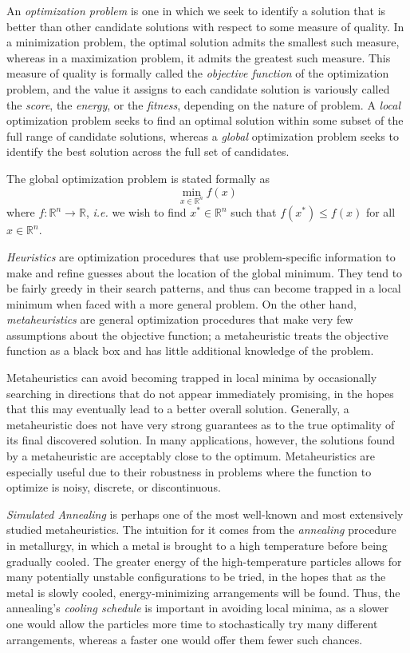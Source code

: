 \documentclass[12pt]{article}
\begin{document}
An \emph{optimization problem} is one in which we seek to identify a solution
that is better than other candidate solutions with respect to some measure
of quality.
In a minimization problem, the optimal solution admits the smallest
such measure, whereas in a maximization problem, it admits the greatest such
measure.
This measure of quality is formally called the \emph{objective function} of the
optimization problem, and the value it assigns to each candidate solution is
variously called the \emph{score}, the \emph{energy}, or the \emph{fitness},
depending on the nature of problem.
A \emph{local} optimization problem seeks to find an optimal solution within
some subset of the full range of candidate solutions, whereas a \emph{global}
optimization problem seeks to identify the best solution across the full set of
candidates.

The global optimization problem is stated formally as
$$
\min_{x \in \mathbb{R}^n} f(x)
$$
where $f : \mathbb{R}^n \to \mathbb{R}$,
\emph{i.e.} we wish to find $x^* \in \mathbb{R}^n$
such that $f(x^*) \leq f(x)$ for all $x \in \mathbb{R}^n$.

\emph{Heuristics} are optimization procedures that use problem-specific
information to make and refine guesses about the location of the global
minimum.  They tend to be fairly greedy in their search patterns, and thus can
become trapped in a local minimum when faced with a more general problem.
On the other hand, \emph{metaheuristics} are general optimization procedures
that make very few assumptions about the objective function; a metaheuristic
treats the objective function as a black box and has little additional
knowledge of the problem.

Metaheuristics can avoid becoming trapped in local minima by occasionally
searching in directions that do not appear immediately promising, in the hopes
that this may eventually lead to a better overall solution.
Generally, a metaheuristic does not have very strong guarantees as to the true
optimality of its final discovered solution. In many applications, however, the
solutions found by a metaheuristic are acceptably close to the optimum.
Metaheuristics are especially useful due to their robustness in problems where
the function to optimize is noisy, discrete, or discontinuous.

\emph{Simulated Annealing}\cite{kirkpatrick1983} is perhaps one of the most
well-known and most extensively studied metaheuristics.
The intuition for it comes from the \emph{annealing} procedure in
metallurgy, in which a metal is brought to a high temperature before being
gradually cooled.
The greater energy of the high-temperature particles allows for many
potentially unstable configurations to be tried, in the hopes that as the
metal is slowly cooled, energy-minimizing arrangements will be found.
Thus, the annealing's \emph{cooling schedule} is important in avoiding
local minima, as a slower one would allow the particles more time to
stochastically try many different arrangements, whereas a faster one would
offer them fewer such chances.
\end{document}
